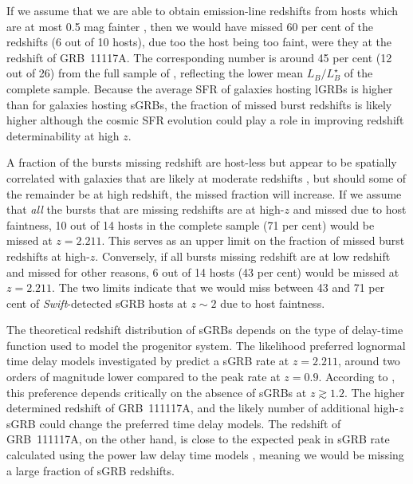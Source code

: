 \documentclass[referee]{aa}
\begin{document}
If we assume that we are able to obtain emission-line redshifts from hosts which
are at most 0.5 mag fainter \citep[$R < 24.5$~mag;][]{Kruhler2012}, then we
would have missed 60 per cent of the redshifts (6 out of 10 hosts), due too the
host being too faint, were they at the redshift of GRB~11117A. The corresponding
number is around 45 per cent (12 out of 26) from the full sample of
\citet{Berger2014}, reflecting the lower mean $L_B/L^{\star}_{B}$ of the
complete sample. Because the average SFR of galaxies hosting lGRBs is higher
than for galaxies hosting sGRBs, the fraction of missed burst redshifts is
likely higher although the cosmic SFR evolution could play a role in improving
redshift determinability at high $z$.

A fraction of the bursts missing redshift are host-less but appear to be
spatially correlated with galaxies that are likely at moderate redshifts
\citep{Tunnicliffe2014}, but should some of the remainder be at high redshift,
the missed fraction will increase. If we assume that \textit{all} the bursts
that are missing redshifts are at high-$z$ and missed due to host faintness, 10
out of 14 hosts in the complete sample (71 per cent) would be missed at $z =
2.211$. This serves as an upper limit on the fraction of missed burst redshifts
at high-$z$. Conversely, if all bursts missing redshift are at low redshift and
missed for other reasons, 6 out of 14 hosts (43 per cent) would be missed at $z
= 2.211$. The two limits indicate that we would miss between 43 and 71 per cent
of \textit{Swift}-detected sGRB hosts at $z \sim 2$ due to host faintness.

The theoretical redshift distribution of sGRBs depends on the type of delay-time
function used to model the progenitor system. The likelihood preferred lognormal
time delay models investigated by \citet{Wanderman2015} predict a sGRB rate at
$z = 2.211$, around two orders of magnitude lower compared to the peak rate at
$z = 0.9$. According to \citet{Wanderman2015}, this preference depends
critically on the absence of sGRBs at $z \gtrsim 1.2$. The higher determined
redshift of GRB~111117A, and the likely number of additional high-$z$ sGRB could
change the preferred time delay models. The redshift of GRB~111117A, on the
other hand, is close to the expected peak in sGRB rate calculated using the
power law delay time models \citep{Behroozi2014, Wanderman2015, Ghirlanda2016},
meaning we would be missing a large fraction of sGRB redshifts.
\end{document}
